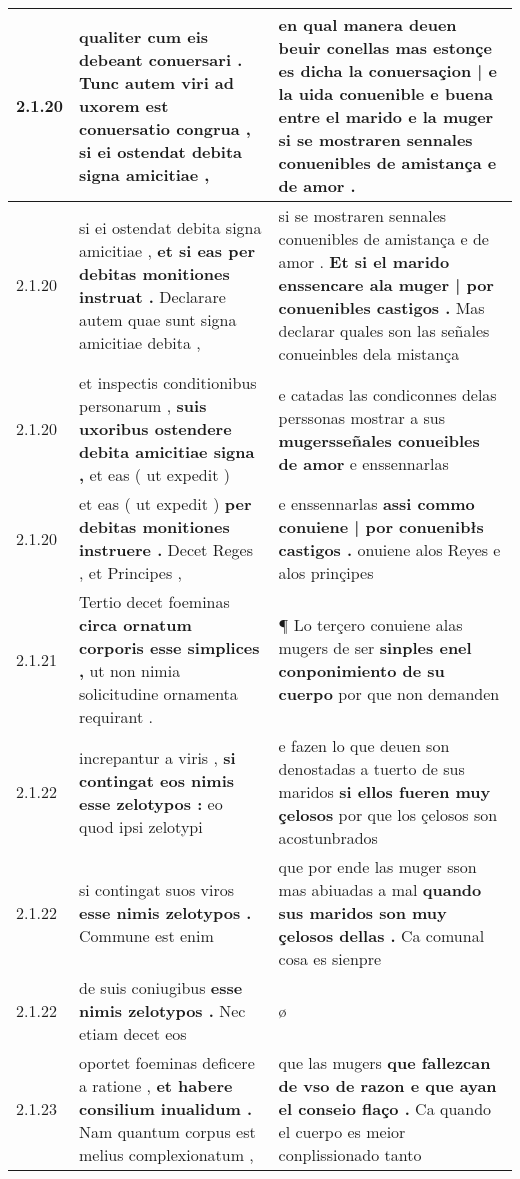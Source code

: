 \begin{tabular}{|p{1cm}|p{6.5cm}|p{6.5cm}|}
2.1.20 & qualiter cum eis debeant conuersari . \textbf{ Tunc autem viri ad uxorem est conuersatio congrua , } si ei ostendat debita signa amicitiae , & en qual manera deuen beuir conellas \textbf{ mas estonçe es dicha la conuersaçion | e la uida conuenible e buena entre el marido e la muger } si se mostraren sennales conuenibles de amistança e de amor . \\\hline
2.1.20 & si ei ostendat debita signa amicitiae , \textbf{ et si eas per debitas monitiones instruat . } Declarare autem quae sunt signa amicitiae debita , & si se mostraren sennales conuenibles de amistança e de amor . \textbf{ Et si el marido enssencare ala muger | por conuenibles castigos . } Mas declarar quales son las señales conueinbles dela mistança \\\hline
2.1.20 & et inspectis conditionibus personarum , \textbf{ suis uxoribus ostendere debita amicitiae signa , } et eas ( ut expedit ) & e catadas las condiconnes delas perssonas mostrar a sus \textbf{ mugersseñales conueibles de amor } e enssennarlas \\\hline
2.1.20 & et eas ( ut expedit ) \textbf{ per debitas monitiones instruere . } Decet Reges , et Principes , & e enssennarlas \textbf{ assi commo conuiene | por conuenibłs castigos . } onuiene alos Reyes e alos prinçipes \\\hline
2.1.21 & Tertio decet foeminas \textbf{ circa ornatum corporis esse simplices , } ut non nimia solicitudine ornamenta requirant . & ¶ Lo terçero conuiene alas mugers de ser \textbf{ sinples enel conponimiento de su cuerpo } por que non demanden \\\hline
2.1.22 & increpantur a viris , \textbf{ si contingat eos nimis esse zelotypos : } eo quod ipsi zelotypi & e fazen lo que deuen son denostadas a tuerto de sus maridos \textbf{ si ellos fueren muy çelosos } por que los çelosos son acostunbrados \\\hline
2.1.22 & si contingat suos viros \textbf{ esse nimis zelotypos . } Commune est enim & que por ende las muger sson mas abiuadas a mal \textbf{ quando sus maridos son muy çelosos dellas . } Ca comunal cosa es sienpre \\\hline
2.1.22 & de suis coniugibus \textbf{ esse nimis zelotypos . } Nec etiam decet eos & ø \\\hline
2.1.23 & oportet foeminas deficere a ratione , \textbf{ et habere consilium inualidum . } Nam quantum corpus est melius complexionatum , & que las mugers \textbf{ que fallezcan de vso de razon e que ayan el conseio flaço . } Ca quando el cuerpo es meior conplissionado tanto \\\hline

\end{tabular}
